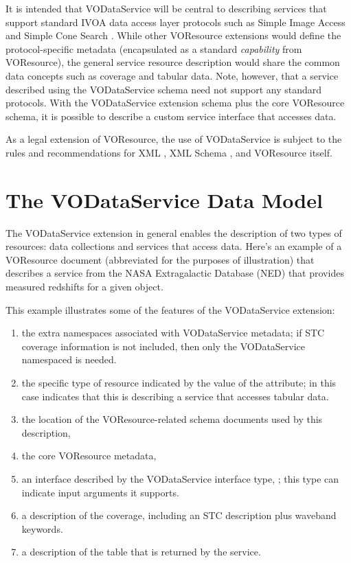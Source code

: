 \documentclass[11pt,a4paper]{ivoa}
\begin{document}
It is intended that VODataService will be central to describing
services that support standard IVOA data access layer protocols such
as Simple Image Access \citep{2015ivoa.spec.1223D} and Simple Cone Search
\citep{2008ivoa.specQ0222P}.  While other VOResource extensions would
define the protocol-specific metadata (encapsulated as a standard
\emph{capability} from VOResource), the general service
resource description would share the common data concepts such as
coverage and tabular data.  Note, however, that a service described
using the VODataService schema need not support any standard
protocols.  With the VODataService extension schema plus the core
VOResource schema, it is possible to describe a custom service
interface that accesses data.  



As a legal extension of VOResource, the use
of VODataService is subject to the rules and recommendations for XML
\citep{std:XML}, XML Schema \citep{std:XSD},
and VOResource itself.  


\section{The VODataService Data Model}


The VODataService extension in general enables the description of two
types of resources:  data collections and services that access data.
Here's an example of a VOResource document (abbreviated for the
purposes of illustration) that describes a service from the NASA
Extragalactic Database (NED) that provides measured redshifts for a
given object.




This example illustrates some of the features of the VODataService
extension:

\begin{enumerate}
\item the extra namespaces associated with
       VODataService metadata; if STC coverage information
        is not
       included, then only the VODataService namespaced is needed.
\item the specific type of resource indicated by
       the value of the  attribute; in this case
        indicates that this is
       describing a service that accesses tabular data.
\item the location of the VOResource-related schema 
       documents used by this description,
\item the core VOResource metadata,
\item an interface described by the
       VODataService interface type, ; this
       type can indicate input arguments it supports.
\item a description of the
       coverage, including an STC
       description plus waveband keywords.
\item a description of the table that is returned
       by the service.
\end{enumerate}
\end{document}
